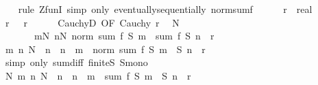 \begin{isabellebody}
\ \ \isamarkupfalse%
\ {\isacharparenleft}{\kern0pt}rule\ ZfunI{\isacharcomma}{\kern0pt}\ simp\ only{\isacharcolon}{\kern0pt}\ eventually{\isacharunderscore}{\kern0pt}sequentially\ norm{\isacharunderscore}{\kern0pt}sum{\isacharunderscore}{\kern0pt}f{\isacharparenright}{\kern0pt}\isanewline
\ \ \ \ \isamarkupfalse%
\ r\ {\isacharcolon}{\kern0pt}{\isacharcolon}{\kern0pt}\ real\isanewline
\ \ \ \ \isamarkupfalse%
\ r{\isacharcolon}{\kern0pt}\ {\isachardoublequoteopen}{}\ {\isacharless}{\kern0pt}\ r{\isachardoublequoteclose}\isanewline
\ \ \ \ \isamarkupfalse%
\ CauchyD\ {\isacharbrackleft}{\kern0pt}OF\ Cauchy\ r{\isacharbrackright}{\kern0pt}\ \isamarkupfalse%
\ N\isanewline
\ \ \ \ \ \ \ {\isachardoublequoteopen}{\isasymforall}m{\isasymge}N{\isachardot}{\kern0pt}\ {\isasymforall}n{\isasymge}N{\isachardot}{\kern0pt}\ norm\ {\isacharparenleft}{\kern0pt}sum\ {\isacharquery}{\kern0pt}f\ {\isacharparenleft}{\kern0pt}{\isacharquery}{\kern0pt}S{}\ m{\isacharparenright}{\kern0pt}\ {\isacharminus}{\kern0pt}\ sum\ {\isacharquery}{\kern0pt}f\ {\isacharparenleft}{\kern0pt}{\isacharquery}{\kern0pt}S{}\ n{\isacharparenright}{\kern0pt}{\isacharparenright}{\kern0pt}\ {\isacharless}{\kern0pt}\ r{\isachardoublequoteclose}\ \isacommand{{\isachardot}{\kern0pt}{\isachardot}{\kern0pt}}\isamarkupfalse%
\isanewline
\ \ \ \ \isamarkupfalse%
\ \isamarkupfalse%
\ {\isachardoublequoteopen}{\isasymAnd}m\ n{\isachardot}{\kern0pt}\ N\ {\isasymle}\ n\ {\isasymLongrightarrow}\ n\ {\isasymle}\ m\ {\isasymLongrightarrow}\ norm\ {\isacharparenleft}{\kern0pt}sum\ {\isacharquery}{\kern0pt}f\ {\isacharparenleft}{\kern0pt}{\isacharquery}{\kern0pt}S{}\ m\ {\isacharminus}{\kern0pt}\ {\isacharquery}{\kern0pt}S{}\ n{\isacharparenright}{\kern0pt}{\isacharparenright}{\kern0pt}\ {\isacharless}{\kern0pt}\ r{\isachardoublequoteclose}\isanewline
\ \ \ \ \ \ \isamarkupfalse%
\ {\isacharparenleft}{\kern0pt}simp\ only{\isacharcolon}{\kern0pt}\ sum{\isacharunderscore}{\kern0pt}diff\ finite{\isacharunderscore}{\kern0pt}S{}\ S{}{\isacharunderscore}{\kern0pt}mono{\isacharparenright}{\kern0pt}\isanewline
\ \ \ \ \isamarkupfalse%
\ \isamarkupfalse%
\ N{\isacharcolon}{\kern0pt}\ {\isachardoublequoteopen}{\isasymAnd}m\ n{\isachardot}{\kern0pt}\ N\ {\isasymle}\ n\ {\isasymLongrightarrow}\ n\ {\isasymle}\ m\ {\isasymLongrightarrow}\ sum\ {\isacharquery}{\kern0pt}f\ {\isacharparenleft}{\kern0pt}{\isacharquery}{\kern0pt}S{}\ m\ {\isacharminus}{\kern0pt}\ {\isacharquery}{\kern0pt}S{}\ n{\isacharparenright}{\kern0pt}\ {\isacharless}{\kern0pt}\ r{\isachardoublequoteclose}\isanewline

\end{isabellebody}
